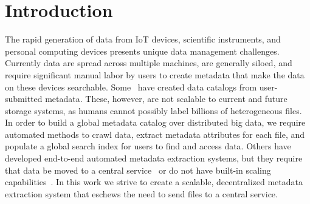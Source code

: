 \documentclass[sigconf, 9pt]{acmart}
\begin{document}
\section{Introduction}

The rapid generation of data from IoT devices, scientific instruments, and personal computing devices presents unique 
data management challenges. Currently data are spread across multiple machines, are generally siloed, and require 
significant manual labor by users to create metadata that make the data on these devices searchable. Some~\cite{egan2003vizier, welter2013nhgri, irods, dataverse}  have created data catalogs from user-submitted metadata. These, however, are not scalable to current and future storage systems,
as humans cannot possibly label billions of heterogeneous files. 
In order to build a global metadata catalog over distributed big data, we require automated methods to crawl data, extract 
metadata attributes for each file, and populate a global search index for users to find and access data. Others have developed end-to-end 
automated metadata extraction systems, but they require that data be moved to a central service~\cite{skluzacek2018skluma, skluzacek2016klimatic, padhy2015brown, rodrigo2018sciencesearch} or do not have built-in scaling capabilities~\cite{mattmann2011tika}. 
In this work we strive to create a scalable, decentralized metadata extraction system that eschews the need to send files to a central service.  

\end{document}
